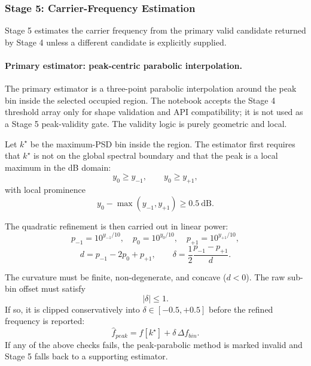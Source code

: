 \documentclass[11pt]{article}
\begin{document}
\subsubsection*{Stage 5: Carrier-Frequency Estimation}

Stage 5 estimates the carrier frequency from the primary valid candidate returned by Stage 4 unless a different candidate is explicitly supplied.

\paragraph{Primary estimator: peak-centric parabolic interpolation.}
The primary estimator is a three-point parabolic interpolation around the peak bin inside the selected occupied region. The notebook accepts the Stage 4 threshold array only for shape validation and API compatibility; it is not used as a Stage 5 peak-validity gate. The validity logic is purely geometric and local.

Let $k^\star$ be the maximum-PSD bin inside the region. The estimator first requires that $k^\star$ is not on the global spectral boundary and that the peak is a local maximum in the dB domain:
\begin{equation}
y_0 \geq y_{-1}, \qquad y_0 \geq y_{+1},
\end{equation}
with local prominence
\begin{equation}
y_0 - \max(y_{-1}, y_{+1}) \geq 0.5~\text{dB}.
\end{equation}

The quadratic refinement is then carried out in linear power:
\begin{equation}
p_{-1} = 10^{y_{-1}/10}, \quad p_0 = 10^{y_0/10}, \quad p_{+1} = 10^{y_{+1}/10},
\end{equation}
\begin{equation}
d = p_{-1} - 2 p_0 + p_{+1}, \qquad \delta = \frac{1}{2} \frac{p_{-1} - p_{+1}}{d}.
\end{equation}

The curvature must be finite, non-degenerate, and concave ($d < 0$). The raw sub-bin offset must satisfy
\begin{equation}
|\delta| \leq 1.
\end{equation}
If so, it is clipped conservatively into $\delta \in [-0.5, +0.5]$ before the refined frequency is reported:
\begin{equation}
\hat{f}_{peak} = f[k^\star] + \delta \, \Delta f_{bin}.
\end{equation}
If any of the above checks fails, the peak-parabolic method is marked invalid and Stage 5 falls back to a supporting estimator.
\end{document}
